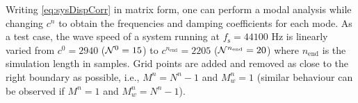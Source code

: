 Writing \eqref{eq:sysDispCorr} in matrix form, one can perform a modal analysis while changing $c^n$ to obtain the frequencies and damping coefficients for each mode. As a test case, the wave speed of a system running at $f_\text{s} = 44100$ Hz is linearly varied from $c^0 = 2940$ ($\mathcal{N}^0 = 15$) to $c^{n_\text{end}} = 2205$ ($\mathcal{N}^{n_\text{end}} = 20$) where $n_\text{end}$ is the simulation length in samples. Grid points are added and removed as close to the right boundary as possible, i.e., $M^n = N^n-1$ and $M_w^n = 1$ (similar behaviour can be observed if $M^n = 1$ and $M_w^n = N^n-1$).  %
